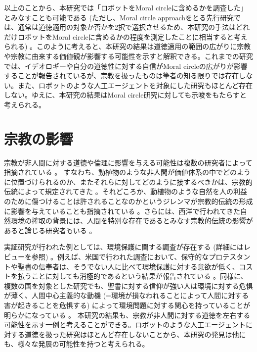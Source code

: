 \documentclass[a4j,12pt]{jreport}
\begin{document}
以上のことから、本研究では「ロボットをMoral circleに含めるかを調査した」とみなすことも可能である (ただし、Moral circle approachをとる先行研究では、通常は道徳適用の対象か否かを2択で選択させるため、本研究の手法はどれだけロボットをMoral circleに含めるかの程度を測定したことに相当すると考えられる) 。このように考えると、本研究の結果は道徳適用の範囲の広がりに宗教や宗教に由来する価値観が影響する可能性を示すと解釈できる。これまでの研究では、イデオロギー\cite{ideo}や自分の道徳性に対する自信\cite{jishin}がMoral circleの広がりが影響することが報告されているが、宗教を扱ったものは筆者の知る限りでは存在しない。また、ロボットのような人工エージェントを対象にした研究もほとんど存在しない。ゆえに、本研究の結果はMoral circle研究に対しても示唆をもたらすと考えられる。

\section{宗教の影響}
宗教が非人間に対する道徳や倫理に影響を与える可能性は複数の研究者によって指摘されている\cite{ecocen, white_, jaga, ser} 。%
すなわち、動植物のような非人間が価値体系の中でどのように位置づけられるのか、またそれらに対してどのように接するべきかは、宗教的伝統によって規定されてきた\cite{jaga} 。それどころか、動植物のような自然を人の利益のために傷つけることは許されることなのかというジレンマが宗教的伝統の形成に影響を与えていることも指摘されている\cite{ser} 。さらには、西洋で行われてきた自然環境の搾取の背景には、人間を特別な存在であるとみなす宗教的伝統の影響があると論じる研究者もいる\cite{white_} 。



実証研究が行われた例としては、環境保護に関する調査が存在する (詳細にはレビュー\cite{proen}を参照) 。例えば、米国で行われた調査において、保守的なプロテスタントや聖書の信奉者は、そうでない人に比べて環境保護に対する意欲が低く、コストを払うことに対しても消極的であるという結果が報告されている\cite{ameri} 。同様に、複数の国を対象とした研究でも、聖書に対する信仰が強い人は環境に対する危惧が薄く、人間中心主義的な動機 (=環境が損なわれることによって人間に対する害が起きることを危惧する) によって環境問題に対する関心を持っていることが明らかになっている\cite{multi} 。
本研究の結果も、宗教が非人間に対する道徳を左右する可能性を示す一例と考えることができる。ロボットのような人工エージェントに対する道徳を扱った研究はほとんど存在しないことから、本研究の発見は他にも、様々な発展の可能性を持つと考えられる。
\end{document}

